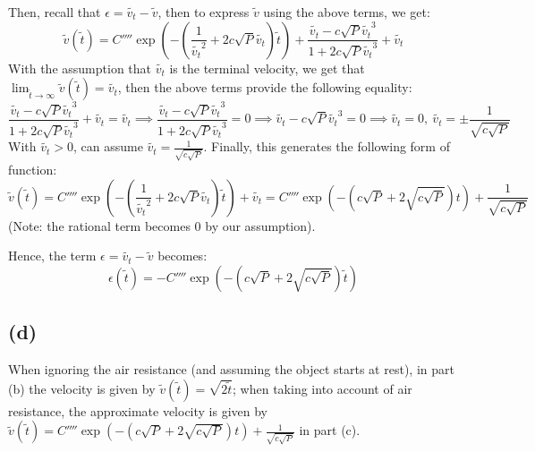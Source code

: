 \documentclass{article}
\begin{document}
\hfil

Then, recall that $\epsilon = \tilde{v_t}-\tilde{v}$, then to express $\tilde{v}$ using the above terms, we get:
$$\tilde{v}(\tilde{t}) = C''''\exp\left(-\left(\frac{1}{\tilde{v_t}^2}+2c\sqrt{P}\tilde{v_t}\right)\tilde{t}\right)+\frac{\tilde{v_t}-c\sqrt{P}\tilde{v_t}^3}{1+2c\sqrt{P}\tilde{v_t}^3}+\tilde{v_t}$$
With the assumption that $\tilde{v_t}$ is the terminal velocity, we get that $\lim_{\tilde{t}\rightarrow\infty}\tilde{v}(\tilde{t}) = \tilde{v_t}$, then the above terms provide the following equality:
$$\frac{\tilde{v_t}-c\sqrt{P}\tilde{v_t}^3}{1+2c\sqrt{P}\tilde{v_t}^3}+\tilde{v_t} = \tilde{v_t}\implies \frac{\tilde{v_t}-c\sqrt{P}\tilde{v_t}^3}{1+2c\sqrt{P}\tilde{v_t}^3}=0\implies \tilde{v_t}-c\sqrt{P}\tilde{v_t}^3=0\implies \tilde{v_t}=0,\ \tilde{v_t} = \pm \frac{1}{\sqrt{c\sqrt{P}}}$$
With $\tilde{v_t}>0$, can assume $\tilde{v_t} = \frac{1}{\sqrt{c\sqrt{P}}}$. Finally, this generates the following form of function:
$$\tilde{v}(\tilde{t}) = C''''\exp\left(-\left(\frac{1}{\tilde{v_t}^2}+2c\sqrt{P}\tilde{v_t}\right)\tilde{t}\right)+\tilde{v_t} = C''''\exp\left(-\left(c\sqrt{P}+2\sqrt{c\sqrt{P}}\right)t\right)+\frac{1}{\sqrt{c\sqrt{P}}}$$
(Note: the rational term becomes $0$ by our assumption).

Hence, the term $\epsilon = \tilde{v_t}-\tilde{v}$ becomes:
$$\epsilon(\tilde{t}) = -C''''\exp\left(-\left(c\sqrt{P}+2\sqrt{c\sqrt{P}}\right)\tilde{t}\right)$$

\hfil

\subsection*{(d)}
When ignoring the air resistance (and assuming the object starts at rest), in part (b) the velocity is given by $\tilde{v}(\tilde{t}) = \sqrt{2\tilde{t}}$; when taking into account of air resistance, the approximate velocity is given by $\tilde{v}(\tilde{t}) = C''''\exp\left(-\left(c\sqrt{P}+2\sqrt{c\sqrt{P}}\right)t\right)+\frac{1}{\sqrt{c\sqrt{P}}}$ in part (c).
\end{document}

